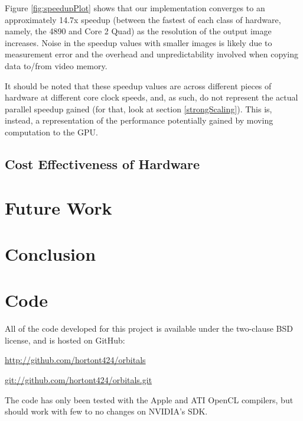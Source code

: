 \documentclass{acmsiggraph}
\begin{document}
Figure \ref{fig:speedupPlot} shows that our implementation converges to an approximately 14.7x speedup (between the fastest of each class of hardware, namely, the 4890 and Core 2 Quad) as the resolution of the output image increases. Noise in the speedup values with smaller images is likely due to measurement error and the overhead and unpredictability involved when copying data to/from video memory.

It should be noted that these speedup values are across different pieces of hardware at different core clock speeds, and, as such, do not represent the actual parallel speedup gained (for that, look at section \ref{strongScaling}). This is, instead, a representation of the performance potentially gained by moving computation to the GPU.

\subsection{Cost Effectiveness of Hardware}

\section{Future Work}

\section{Conclusion}

\section{Code}

All of the code developed for this project is available under the two-clause BSD license, and is hosted on GitHub:

\url{http://github.com/hortont424/orbitals}

\url{git://github.com/hortont424/orbitals.git}

The code has only been tested with the Apple and ATI OpenCL compilers, but should work with few to no changes on NVIDIA's SDK.


\nocite{*}

\end{document}
